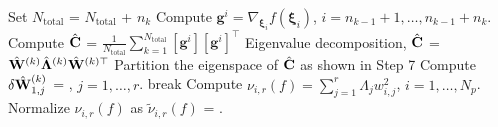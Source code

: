 \begin{breakablealgorithm}
\begin{algorithmic}[1]
		\State Set $N_\text{total}$ = $N_\text{total}$ + $n_k$ 
		\State Compute $\bm{g}^i = \nabla_{\bm{\xi}_i}f(\bm{\xi}_i)$, 
             	$i=n_{k-1}+1, \ldots, n_{k-1}+n_k$.  
		\State Compute $\hat{\mathbf{{C}}}$ = 
        	$\frac{1}{N_\text{total}}\sum\limits_{k=1}^{N_\text{total}}[\bm{g}^i][\bm{g}^i]^\top$
		\State Eigenvalue decomposition, $\hat{\mathbf{{C}}}$ = $\hat{\mathbf{{W}}}^{(k)}\hat{\mathbf{{\Lambda}}}^{(k)}
		 \hat{\mathbf{{W}}}^{(k)\top}$
		\State Partition the eigenspace of $\hat{\mathbf{{C}}}$ as shown in Step 7
		\State Compute $\delta \hat{\mathbf{{W}}}_{1,j}^{(k)}$ = 
                       , 
                       $j = 1,\ldots,r$.
			\State break
		\EndIf
	\EndLoop
	\State Compute $\nu_{i,r}(f) = \sum\limits_{j=1}^{r} \Lambda_j w_{i,j}^2$,
	$i=1,\ldots,N_p$.
	\State Normalize $\nu_{i,r}(f)$ as $\tilde{\nu}_{i,r}(f)$ = .
	
    \EndProcedure
  \end{algorithmic}
  \label{alg:grad}
\end{breakablealgorithm}
\bigskip

